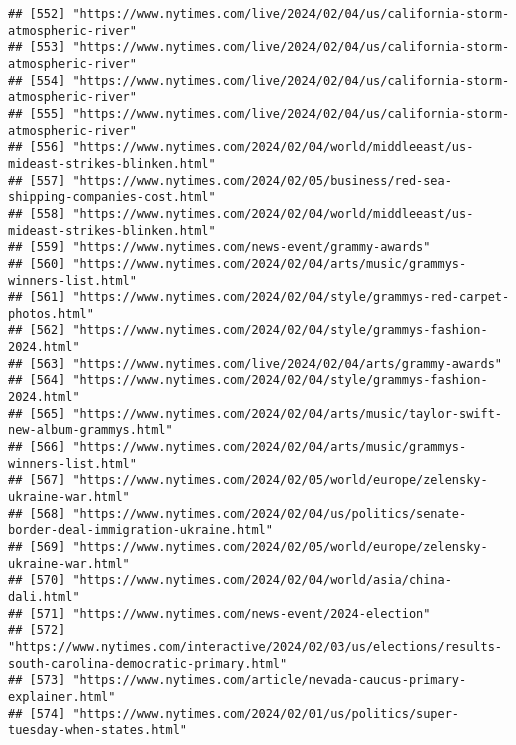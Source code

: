 \documentclass[
]{article}
\begin{document}
\begin{verbatim}
## [552] "https://www.nytimes.com/live/2024/02/04/us/california-storm-atmospheric-river"                             
## [553] "https://www.nytimes.com/live/2024/02/04/us/california-storm-atmospheric-river"                             
## [554] "https://www.nytimes.com/live/2024/02/04/us/california-storm-atmospheric-river"                             
## [555] "https://www.nytimes.com/live/2024/02/04/us/california-storm-atmospheric-river"                             
## [556] "https://www.nytimes.com/2024/02/04/world/middleeast/us-mideast-strikes-blinken.html"                       
## [557] "https://www.nytimes.com/2024/02/05/business/red-sea-shipping-companies-cost.html"                          
## [558] "https://www.nytimes.com/2024/02/04/world/middleeast/us-mideast-strikes-blinken.html"                       
## [559] "https://www.nytimes.com/news-event/grammy-awards"                                                          
## [560] "https://www.nytimes.com/2024/02/04/arts/music/grammys-winners-list.html"                                   
## [561] "https://www.nytimes.com/2024/02/04/style/grammys-red-carpet-photos.html"                                   
## [562] "https://www.nytimes.com/2024/02/04/style/grammys-fashion-2024.html"                                        
## [563] "https://www.nytimes.com/live/2024/02/04/arts/grammy-awards"                                                
## [564] "https://www.nytimes.com/2024/02/04/style/grammys-fashion-2024.html"                                        
## [565] "https://www.nytimes.com/2024/02/04/arts/music/taylor-swift-new-album-grammys.html"                         
## [566] "https://www.nytimes.com/2024/02/04/arts/music/grammys-winners-list.html"                                   
## [567] "https://www.nytimes.com/2024/02/05/world/europe/zelensky-ukraine-war.html"                                 
## [568] "https://www.nytimes.com/2024/02/04/us/politics/senate-border-deal-immigration-ukraine.html"                
## [569] "https://www.nytimes.com/2024/02/05/world/europe/zelensky-ukraine-war.html"                                 
## [570] "https://www.nytimes.com/2024/02/04/world/asia/china-dali.html"                                             
## [571] "https://www.nytimes.com/news-event/2024-election"                                                          
## [572] "https://www.nytimes.com/interactive/2024/02/03/us/elections/results-south-carolina-democratic-primary.html"
## [573] "https://www.nytimes.com/article/nevada-caucus-primary-explainer.html"                                      
## [574] "https://www.nytimes.com/2024/02/01/us/politics/super-tuesday-when-states.html"                             

\end{verbatim}
\end{document}
